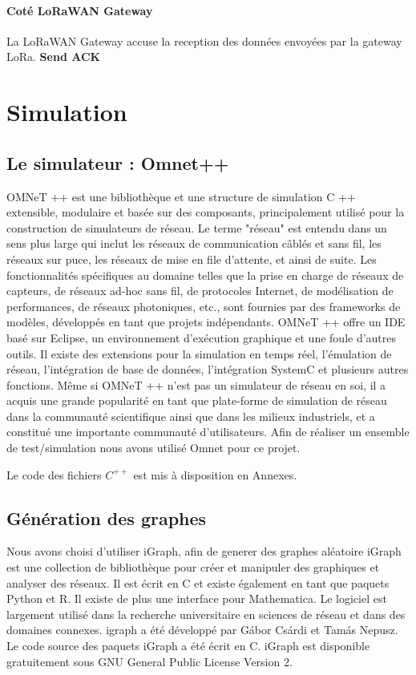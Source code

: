 \documentclass[11pt]{article}
\begin{document}
\paragraph{Coté LoRaWAN Gateway}
La LoRaWAN Gateway accuse la reception des données envoyées par la gateway LoRa.
\textbf{Send ACK}


\newpage
\section{Simulation}

\subsection{Le simulateur : Omnet++}
OMNeT ++ est une bibliothèque et une structure de simulation C ++ extensible, modulaire et basée sur des composants, principalement utilisé pour la construction de simulateurs de réseau. Le terme "réseau" est entendu dans un sens plus large qui inclut les réseaux de communication câblés et sans fil, les réseaux sur puce, les réseaux de mise en file d'attente, et ainsi de suite. Les fonctionnalités spécifiques au domaine telles que la prise en charge de réseaux de capteurs, de réseaux ad-hoc sans fil, de protocoles Internet, de modélisation de performances, de réseaux photoniques, etc., sont fournies par des frameworks de modèles, développés en tant que projets indépendants. OMNeT ++ offre un IDE basé sur Eclipse, un environnement d'exécution graphique et une foule d'autres outils. Il existe des extensions pour la simulation en temps réel, l'émulation de réseau, l'intégration de base de données, l'intégration SystemC et plusieurs autres fonctions.
Même si OMNeT ++ n'est pas un simulateur de réseau en soi, il a acquis une grande popularité en tant que plate-forme de simulation de réseau dans la communauté scientifique ainsi que dans les milieux industriels, et a constitué une importante communauté d'utilisateurs.
Afin de réaliser un ensemble de test/simulation nous avons utilisé Omnet pour ce projet.

Le code des fichiers $C^{++}$ est mis à disposition en Annexes.
\subsection{Génération des graphes}
Nous avons choisi d'utiliser iGraph, afin de generer des graphes aléatoire
iGraph est une collection de bibliothèque pour créer et manipuler des graphiques et analyser des réseaux. Il est écrit en C et existe également en tant que paquets Python et R. Il existe de plus une interface pour Mathematica. Le logiciel est largement utilisé dans la recherche universitaire en sciences de réseau et dans des domaines connexes.
igraph a été développé par Gábor Csárdi et Tamás Nepusz. Le code source des paquets iGraph a été écrit en C. iGraph est disponible gratuitement sous GNU General Public License Version 2.
\end{document}
